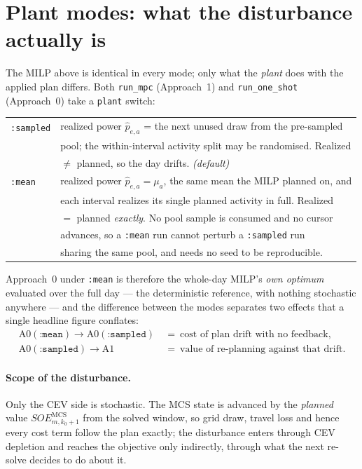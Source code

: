 \documentclass[11pt]{article}
\begin{document}
\section{Plant modes: what the disturbance actually is}
\label{sec:plant}
The MILP above is identical in every mode; only what the \emph{plant} does with the applied
plan differs. Both \texttt{run\_mpc} (Approach~1) and \texttt{run\_one\_shot} (Approach~0)
take a \texttt{plant} switch:

\medskip
\begin{tabular}{ll}
\texttt{:sampled} & realized power $\hat p_{e,a}$ = the next unused draw from the pre-sampled\\
                  & pool; the within-interval activity split may be randomised. Realized\\
                  & $\ne$ planned, so the day drifts. \emph{(default)}\\[4pt]
\texttt{:mean}    & realized power $\hat p_{e,a}=\mu_a$, the same mean the MILP planned on, and\\
                  & each interval realizes its single planned activity in full. Realized\\
                  & $=$ planned \emph{exactly}. No pool sample is consumed and no cursor\\
                  & advances, so a \texttt{:mean} run cannot perturb a \texttt{:sampled} run\\
                  & sharing the same pool, and needs no seed to be reproducible.\\
\end{tabular}

\medskip
Approach~0 under \texttt{:mean} is therefore the whole-day MILP's \emph{own optimum} evaluated
over the full day --- the deterministic reference, with nothing stochastic anywhere --- and
the difference between the modes separates two effects that a single headline figure conflates:
\begin{align*}
\text{A0}(\texttt{:mean})\to\text{A0}(\texttt{:sampled})\ &=\ \text{cost of plan drift with no feedback},\\
\text{A0}(\texttt{:sampled})\to\text{A1}\ &=\ \text{value of re-planning against that drift}.
\end{align*}

\paragraph{Scope of the disturbance.} Only the CEV side is stochastic. The MCS state is
advanced by the \emph{planned} value $SOE^{\text{MCS}}_{m,k_0+1}$ from the solved window, so
grid draw, travel loss and hence every cost term follow the plan exactly; the disturbance
enters through CEV depletion and reaches the objective only indirectly, through what the next
re-solve decides to do about it.
\end{document}
